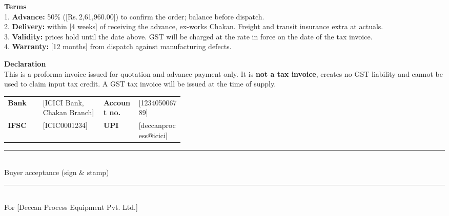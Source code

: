 \documentclass[10pt]{article}
\begin{document}
\noindent\colorbox{notebg}{\parbox{\dimexpr\linewidth-2\fboxsep}{\footnotesize {\color{accent}\bfseries Terms}\\ 1. \textbf{Advance:} 50\% ([Rs.\,2,61,960.00]) to confirm the order; balance before dispatch.\\ 2. \textbf{Delivery:} within [4 weeks] of receiving the advance, ex-works Chakan. Freight and transit insurance extra at actuals.\\ 3. \textbf{Validity:} prices hold until the date above. GST will be charged at the rate in force on the date of the tax invoice.\\ 4. \textbf{Warranty:} [12 months] from dispatch against manufacturing defects.}}\par\vspace{6pt}

\noindent\colorbox{notebg}{\parbox{\dimexpr\linewidth-2\fboxsep}{\footnotesize {\color{accent}\bfseries Declaration}\\ This is a proforma invoice issued for quotation and advance payment only. It is \textbf{not a tax invoice}, creates no GST liability and cannot be used to claim input tax credit. A GST tax invoice will be issued at the time of supply.}}\par\vspace{6pt}

\begin{tabularx}{\linewidth}{@{}p{0.2\linewidth}X p{0.2\linewidth}X@{}}
\textbf{Bank} & [ICICI Bank, Chakan Branch] & \textbf{Account no.} & [123405006789] \\
\textbf{IFSC} & [ICIC0001234] & \textbf{UPI} & [deccanprocess@icici] \\
\end{tabularx}\par\vspace{2pt}

\vspace{32pt}\noindent\parbox[t]{0.3\linewidth}{\centering\rule{\linewidth}{0.5pt}\\ Buyer acceptance (sign \& stamp)}\hfill\parbox[t]{0.3\linewidth}{\centering\rule{\linewidth}{0.5pt}\\ For [Deccan Process Equipment Pvt. Ltd.]}\par
\end{document}
